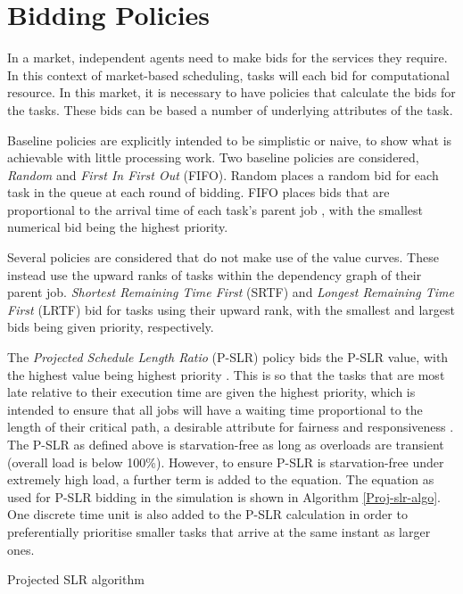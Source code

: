 \documentclass[english,british]{IEEEtran}
\begin{document}
\section{Bidding Policies}

In a market, independent agents need to make bids for the services
they require. In this context of market-based scheduling, tasks will
each bid for computational resource. In this market, it is necessary
to have policies that calculate the bids for the tasks. These bids
can be based a number of underlying attributes of the task.

Baseline policies are explicitly intended to be simplistic or naive,
to show what is achievable with little processing work. Two baseline
policies are considered, \emph{Random} and \emph{First In First Out}
(FIFO). Random places a random bid for each task in the queue at each
round of bidding. FIFO places bids that are proportional to the arrival
time of each task's parent job ,
with the smallest numerical bid being the highest priority.

Several policies are considered that do not make use of the value
curves. These instead use the upward ranks of tasks  within
the dependency graph of their parent job. \emph{Shortest Remaining
Time First} (SRTF) and \emph{Longest Remaining Time First} (LRTF)
\cite{zhaosakellariou06,Topcuoglu2002} bid for tasks using their
upward rank, with the smallest and largest bids being given priority,
respectively.

The \emph{Projected Schedule Length Ratio} (P-SLR) policy bids the
P-SLR value, with the highest value being highest priority \cite{burkimsher12}.
This is so that the tasks that are most late relative to their execution
time are given the highest priority, which is intended to ensure that
all jobs will have a waiting time proportional to the length of their
critical path, a desirable attribute for fairness and responsiveness
\cite{saule10}. The P-SLR as defined above is starvation-free as
long as overloads are transient (overall load is below 100\%). However,
to ensure P-SLR is starvation-free under extremely high load, a further
term is added to the equation. The equation as used for P-SLR bidding
in the simulation is shown in Algorithm \ref{Proj-slr-algo}. One
discrete time unit is also added to the P-SLR calculation in order
to preferentially prioritise smaller tasks that arrive at the same
instant as larger ones.

\begin{algorithm}




\protect\caption{Projected SLR algorithm}
\label{Proj-slr-algo}
\end{algorithm}
\end{document}
